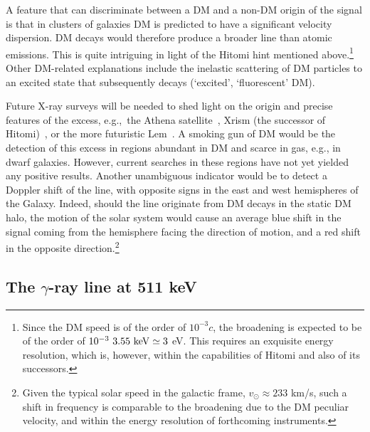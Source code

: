 \smallskip

A feature that can discriminate between a DM and a non-DM origin of the signal is that in clusters of galaxies DM is predicted to have a significant velocity dispersion. DM decays would therefore produce a broader line than atomic emissions. This is quite intriguing in light of the {\sc Hitomi} hint mentioned above.\footnote{Since the DM speed is of the order of $10^{-3} c$, the broadening is expected to be of the order of $10^{-3} \, \, 3.55 \ {\rm keV} \simeq 3$ eV. This requires an exquisite energy resolution, which is, however, within the capabilities of {\sc Hitomi} and also of its successors.} 
Other DM-related explanations include the inelastic scattering of DM particles to an excited state that subsequently decays (`excited', `fluorescent' DM).

\medskip

Future X-ray surveys will be needed to shed light on the origin and precise features of the excess, 
e.g.,~the {\sc Athena} satellite~\cite{Athena}, {\sc Xrism} (the successor of {\sc Hitomi})~\cite{Xrism},
or the more futuristic {\sc Lem}~\cite{2211.09827}. 
A smoking gun of DM would be the detection of this excess in regions abundant in DM and scarce in gas, e.g., in
 dwarf galaxies. 
However, current searches in these regions have not yet yielded any positive results. 
Another unambiguous indicator would be to detect a Doppler shift of the line, with opposite signs in the east and west hemispheres of the Galaxy. Indeed, should the line originate from DM decays in the static DM halo, the motion of the solar system would cause an average blue shift in the signal coming from the hemisphere facing the direction of motion, and a red shift in the opposite direction.\footnote{Given the typical solar speed in the galactic frame, $v_\odot \approx 233$ km/s, such a shift in frequency is comparable to the broadening due to the DM peculiar velocity, and within the energy resolution of forthcoming instruments.}




\subsection{The $\gamma$-ray line at 511 keV}\label{sec:511KeVline}

